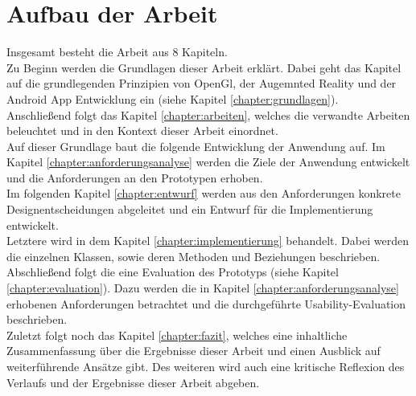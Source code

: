 \section{Aufbau der Arbeit}
Insgesamt besteht die Arbeit aus 8 Kapiteln.\\
Zu Beginn werden die Grundlagen dieser Arbeit erklärt. Dabei geht das Kapitel auf die grundlegenden Prinzipien von OpenGl, der Augemnted Reality und der Android App Entwicklung ein (siehe Kapitel \ref{chapter:grundlagen}). \\
Anschließend folgt das Kapitel \ref{chapter:arbeiten}, welches die verwandte Arbeiten beleuchtet und in den Kontext dieser Arbeit einordnet.\\
Auf dieser Grundlage baut die folgende Entwicklung der Anwendung auf. Im Kapitel \ref{chapter:anforderungsanalyse} werden die Ziele der Anwendung entwickelt und die Anforderungen an den Prototypen erhoben.\\
Im folgenden Kapitel \ref{chapter:entwurf} werden aus den Anforderungen konkrete Designentscheidungen abgeleitet und ein Entwurf für die Implementierung entwickelt.\\
Letztere wird in dem Kapitel \ref{chapter:implementierung} behandelt. Dabei werden die einzelnen Klassen, sowie deren Methoden und Beziehungen beschrieben. \\
Abschließend folgt die eine Evaluation des Prototyps (siehe Kapitel \ref{chapter:evaluation}). Dazu werden die in Kapitel \ref{chapter:anforderungsanalyse} erhobenen Anforderungen betrachtet und die durchgeführte Usability-Evaluation beschrieben. \\
Zuletzt folgt noch das Kapitel \ref{chapter:fazit}, welches eine inhaltliche Zusammenfassung über die Ergebnisse dieser Arbeit und einen Ausblick auf weiterführende Ansätze gibt. Des weiteren wird auch eine kritische Reflexion des Verlaufs und der Ergebnisse dieser Arbeit abgeben.


